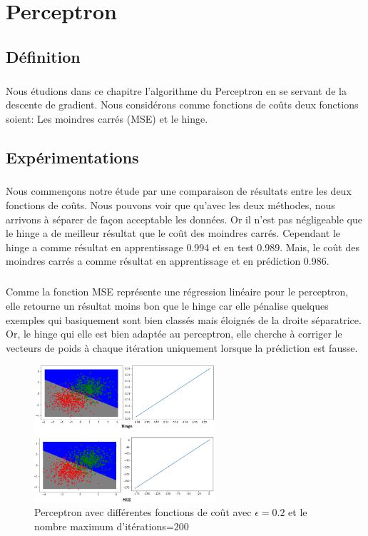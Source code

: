 \documentclass{report}
\begin{document}
\chapter{Perceptron}
\section{Définition}
\paragraph{}
Nous étudions dans ce chapitre l'algorithme du Perceptron en se servant de la descente de gradient. Nous considérons comme fonctions de coûts deux fonctions soient: Les moindres carrés (MSE) et le hinge.
\section{Expérimentations}
\paragraph{}
Nous commençons notre étude par une comparaison de résultats entre les deux fonctions de coûts. Nous pouvons voir que qu'avec les deux méthodes, nous arrivons à séparer de façon acceptable les données. Or il n'est pas négligeable que le hinge a de meilleur résultat que le coût des moindres carrés. Cependant le hinge a comme résultat en apprentissage 0.994 et en test 0.989. Mais, le coût des moindres carrés a comme résultat en apprentissage et en prédiction 0.986.
\paragraph{}
Comme la fonction MSE représente une régression linéaire pour le perceptron, elle retourne un résultat moins bon que le hinge car elle pénalise quelques exemples qui basiquement sont bien classés mais éloignés de la droite séparatrice. Or, le hinge qui elle est bien adaptée au perceptron, elle cherche à corriger le vecteurs de poids à chaque itération uniquement lorsque la prédiction est fausse. 
 \begin{figure}[H]
	\begin{center}
		\includegraphics[width=0.6\textwidth]{hVSm.png}
		\caption{Perceptron avec différentes fonctions de coût avec $\epsilon=0.2$ et le nombre maximum d'itérations=200}
	\end{center}
\end{figure}
\end{document}
